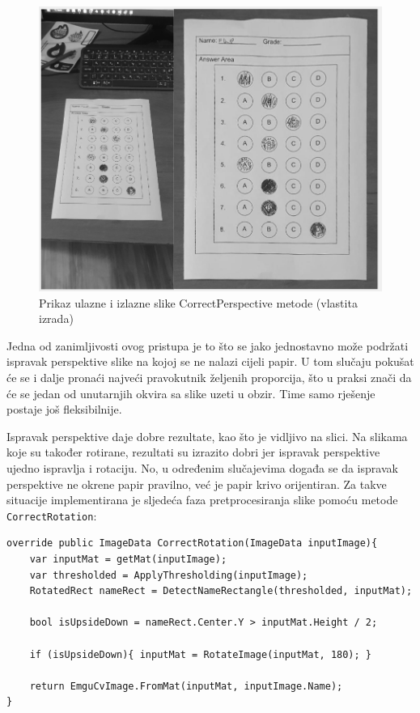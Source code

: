 \documentclass{foi}
\begin{document}
\begin{figure}[H]
\centering
\includegraphics[width=0.8\linewidth]{slike/PerspectiveComparison.png}
\caption{Prikaz ulazne i izlazne slike CorrectPerspective metode (vlastita izrada)}
\end{figure}

Jedna od zanimljivosti ovog pristupa je to što se jako jednostavno može podržati ispravak perspektive slike na kojoj se ne nalazi cijeli papir. U tom slučaju pokušat će se i dalje pronaći najveći pravokutnik željenih proporcija, što u praksi znači da će se jedan od unutarnjih okvira sa slike uzeti u obzir. Time samo rješenje postaje još fleksibilnije.

Ispravak perspektive daje dobre rezultate, kao što je vidljivo na slici. Na slikama koje su također rotirane, rezultati su izrazito dobri jer ispravak perspektive ujedno ispravlja i rotaciju. No, u određenim slučajevima događa se da ispravak perspektive ne okrene papir pravilno, već je papir krivo orijentiran. Za takve situacije implementirana je sljedeća faza pretprocesiranja slike pomoću metode \texttt{CorrectRotation}:


\begin{lstlisting}[caption={Metoda za provjeru i ispravak orijentacije slike}]
override public ImageData CorrectRotation(ImageData inputImage){
    var inputMat = getMat(inputImage);
    var thresholded = ApplyThresholding(inputImage);
    RotatedRect nameRect = DetectNameRectangle(thresholded, inputMat);

    bool isUpsideDown = nameRect.Center.Y > inputMat.Height / 2;

    if (isUpsideDown){ inputMat = RotateImage(inputMat, 180); }

    return EmguCvImage.FromMat(inputMat, inputImage.Name);
}
\end{lstlisting}
\end{document}
